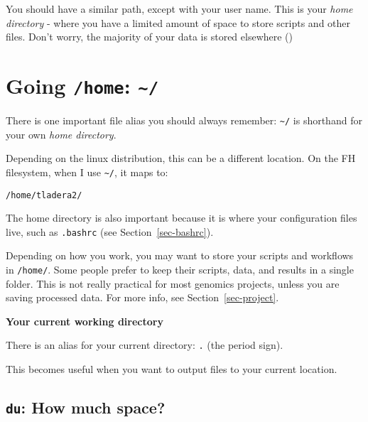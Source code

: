\documentclass[
  letterpaper,
  DIV=11,
  numbers=noendperiod]{scrreprt}
\begin{document}
You should have a similar path, except with your user name. This is your
\emph{home directory} - where you have a limited amount of space to
store scripts and other files. Don't worry, the majority of your data is
stored elsewhere ()

\section{\texorpdfstring{Going \texttt{/home}:
\texttt{\textasciitilde{}/}}{Going /home: \textasciitilde/}}\label{sec-home}

There is one important file alias you should always remember:
\texttt{\textasciitilde{}/} is shorthand for your own \emph{home
directory}.

Depending on the linux distribution, this can be a different location.
On the FH filesystem, when I use \texttt{\textasciitilde{}/}, it maps
to:

\texttt{/home/tladera2/}

The home directory is also important because it is where your
configuration files live, such as \texttt{.bashrc} (see
Section~\ref{sec-bashrc}).

Depending on how you work, you may want to store your scripts and
workflows in \texttt{/home/}. Some people prefer to keep their scripts,
data, and results in a single folder. This is not really practical for
most genomics projects, unless you are saving processed data. For more
info, see Section~\ref{sec-project}.

\begin{tcolorbox}[enhanced jigsaw, breakable, leftrule=.75mm, colframe=quarto-callout-color-frame, left=2mm, toprule=.15mm, arc=.35mm, rightrule=.15mm, opacityback=0, bottomrule=.15mm, colback=white]

\vspace{-3mm}\textbf{Your current working directory}\vspace{3mm}

There is an alias for your current directory: \texttt{.} (the period
sign).

This becomes useful when you want to output files to your current
location.

\end{tcolorbox}

\subsection{\texorpdfstring{\texttt{du}: How much
space?}{du: How much space?}}\label{du-how-much-space}
\end{document}
